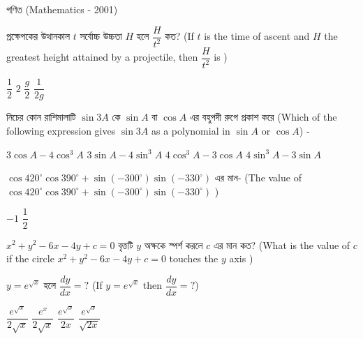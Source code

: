 \documentclass[addpoints]{exam}
\begin{document}
\begin{LARGE}
\begin{center}
গণিত (Mathematics - 2001)
\end{center}
\end{LARGE}
\begin{questions}

\question  প্রক্ষেপকের উত্থানকাল $ t $ সর্বোচ্চ উচ্চতা $ H $ হলে $ \dfrac{H}{t^{2}} $ কত? (If $ t $ is the time of ascent and $ H $ the greatest height attained by a projectile, then $ \dfrac{H}{t^{2}} $ is )

\begin{oneparchoices}
\choice $ \dfrac{1}{2} $
\choice $ 2 $
\choice $ \dfrac{g}{2} $
\choice $ \dfrac{1}{2g} $
\end{oneparchoices}

\question নিচের কোন রাশিমালাটি $ \sin 3A $ কে $ \sin A $ বা $ \cos A $ এর বহুপদী রুপে প্রকাশ করে (Which of the following expression gives  $ \sin 3A $ as a polynomial in $ \sin A $ or $ \cos A $) -

\begin{oneparchoices}
\choice  $ 3\cos A -4\cos^{3} A $
\choice  $ 3\sin A -4\sin^{3} A $
\choice  $ 4\cos^{3} A -3\cos A $
\choice  $ 4\sin^{3} A -3\sin A $
\end{oneparchoices}

\question  $ \cos 420^{\circ}\cos 390^{\circ} + \sin (-300^{\circ})\sin (-330^{\circ}) $ এর মান- (The value of $ \cos 420^{\circ}\cos 390^{\circ} + \sin (-300^{\circ})\sin (-330^{\circ}) $ ) 

\begin{oneparchoices}
\choice  $ -1 $
\choice  $ \dfrac{1}{2} $
\end{oneparchoices}

\question $ x^{2}+y^{2}-6x-4y+c=0 $ বৃত্তটি $ y $ অক্ষকে স্পর্শ করলে $ c $ এর মান কত? (What is the value of $ c $ if the circle $ x^{2}+y^{2}-6x-4y+c=0 $ touches the $ y $ axis )

\begin{oneparchoices}
\end{oneparchoices}

\question $ y=e^{\sqrt{x}} $ হলে $ \dfrac{dy}{dx}=?  $ (If $ y=e^{\sqrt{x}} $ then $ \dfrac{dy}{dx}=?  $) 

\begin{oneparchoices}
\choice $ \dfrac{e^{\sqrt{x}}}{2\sqrt{x}} $
\choice $ \dfrac{e^{x}}{2\sqrt{x}} $
\choice $ \dfrac{e^{\sqrt{x}}}{2x} $
\choice $ \dfrac{e^{\sqrt{x}}}{\sqrt{2x}} $
\end{oneparchoices}


\end{questions}
\end{document}
